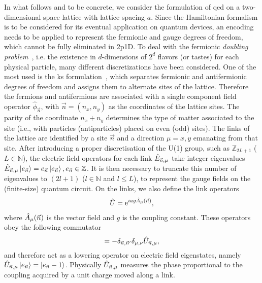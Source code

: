 In what follows and to be concrete, we consider the formulation of \gls{qed} on a two-dimensional space lattice with lattice spacing $a$.
Since the Hamiltonian formalism is to be considered for its eventual application on quantum devices, an encoding needs to be applied to represent the fermionic and gauge degrees of freedom, which cannot be fully eliminated in \gls{2p1D}.  To deal with the fermionic \textit{doubling problem}~\cite{NIELSEN1981219,PhysRevD.16.3031,rothe2012lattice}, i.e. the existence in $d$-dimensions of $2^d$ flavors (or tastes) for each physical particle, many different discretizations have been considered. One of the most used is the \gls{ks} formulation~\cite{Kogut1975}, which separates fermionic and antifermionic degrees of freedom and assigns them to alternate sites of the lattice. Therefore the fermions and antifermions are associated with a single component field operator $\hat{\phi}_{\vec{n}}$, with $\vec{n}=(n_x,n_y)$ as the coordinates of the lattice sites. The parity of the coordinate $n_x + n_y$ determines the type of matter associated to the site (i.e., with particles (antiparticles) placed on even (odd) sites).
The links of the lattice are identified by a site $\vec{n}$ and a direction $\mu = x,y$ emanating from that site. After introducing a proper discretisation of the U(1) group, such as $\mathbb{Z}_{2L+1}$ ($L \in \mathbb{N}$), the electric field operators for each link $\hat{E}_{\vec{n}, \mu}$ take integer eigenvalues $\hat{E}_{\vec{n}, {\mu}}\ket{e_{\vec{n}}}=e_{\vec{n}}\ket{e_{\vec{n}}}, e_{\vec{n}} \in \mathbb{Z}$. It is then necessary to truncate this number of eigenvalues to $(2l+1)$ ($l \in \mathbb{N}$ and $l\le L$), to represent the gauge fields on the (finite-size) quantum circuit. On the links, we also define the link operators
\begin{eqnarray}
\hat{U} = \mathrm{e}^{iag\hat{A}_{\mu}(\vec{n})},
\end{eqnarray}
where $\hat{A}_{\mu}(\vec{n})$ is the vector field and $g$ is the coupling constant. 
These operators obey the following commutator
\begin{equation}
[\oper{E}_{\vec{n}, \mu},\oper{U}_{\vec{n}^\prime, \nu}] = - \delta_{\vec{n},\vec{n}^\prime} \delta_{\mu,\nu}\oper{U}_{\vec{n}, \mu},
\end{equation}
and therefore act as a lowering operator on electric field eigenstates, namely $\hat{U}_{\vec{n}, {\mu}}\ket{e_{\vec{n}}}=\ket{e_{\vec{n}}-1}$. Physically $\hat{U}_{\vec{n},\mu}$ measures the phase proportional to the coupling acquired by a unit charge moved along a link. 


